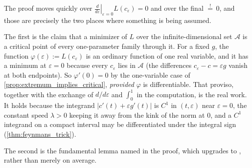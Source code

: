 \begin{remark}
\label{rem:geodesic_hidden_steps}
The proof moves quickly over $\left.\frac{d}{d\varepsilon}\right|_{\varepsilon=0}L(c_\varepsilon)
= 0$ and over the final $\overset{!}{=}\,0$, and those are precisely the two places where
something is being assumed.

The first is the claim that a minimizer of $L$ over the infinite-dimensional set $\mathcal A$ is
a critical point of every one-parameter family through it. For a fixed $g$, the function
$\varphi(\varepsilon) := L(c_\varepsilon)$ is an ordinary function of one real variable, and it
has a minimum at $\varepsilon = 0$ because every $c_\varepsilon$ lies in $\mathcal A$ (the
differences $c_\varepsilon - c = \varepsilon g$ vanish at both endpoints). So
$\varphi'(0) = 0$ by the one-variable case of \cref{prop:extremum_implies_critical},
\emph{provided} $\varphi$ is differentiable. That proviso, together with the exchange of
$d/d\varepsilon$ and $\int_0^1$ in the computation, is the real work. It holds because the
integrand $\lvert c'(t) + \varepsilon g'(t)\rvert$ is $C^1$ in $(t,\varepsilon)$ near
$\varepsilon = 0$, the constant speed $\lambda > 0$ keeping it away from the kink of the norm at
$0$, and a $C^1$ integrand on a compact interval may be differentiated under the integral sign
(\cref{thm:feynmans_trick}).

The second is the fundamental lemma named in the proof, which upgrades  to , rather than merely on average.
\end{remark}

